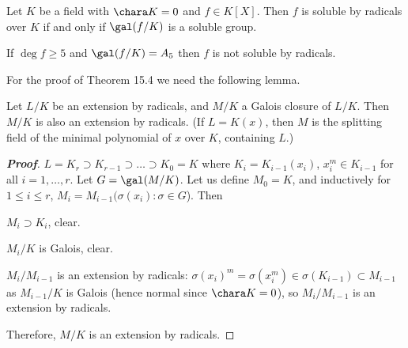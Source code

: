 \begin{theorem}
Let $K$ be a field with $\chara K = 0$ and $f \in K[X]$. Then $f$ is soluble by radicals over $K$ if and only if $\gal(f/K)$ is a soluble group.
\end{theorem}

\begin{corollary}
If $\deg f \geq 5$ and $\gal(f/K) = A_5$ then $f$ is not soluble by radicals. 
\end{corollary}

For the proof of Theorem 15.4 we need the following lemma.

\begin{lemma}
Let $L/K$ be an extension by radicals, and $M/K$ a Galois closure of $L/K$. Then $M/K$ is also an extension by radicals. (If $L = K(x)$, then $M$ is the splitting field of the minimal polynomial of $x$ over $K$, containing $L$.)
\end{lemma}

\begin{proof}[\bf Proof]
$L = K_r \supset K_{r-1} \supset \dots\supset K_0 = K$ where $K_i = K_{i-1}(x_i)$, $x^m_i \in K_{i-1}$ for all $i = 1, \dots , r$. Let $G = \gal(M/K)$. Let us define $M_0 = K$, and inductively for $1 \leq  i \leq  r$, $M_i = M_{i-1}({\sigma(x_i) : \sigma \in G}$). Then
\bit
\item $M_i \supset K_i$, clear.
\item $M_i/K$ is Galois, clear.
\item $M_i/M_{i-1}$ is an extension by radicals: $\sigma(x_i)^m = \sigma(x^m_i) \in \sigma(K_{i-1}) \subset M_{i-1}$ as $M_{i-1}/K$ is Galois (hence normal since $\chara K = 0$), so $M_i/M_{i-1}$ is an extension by radicals.
\eit

Therefore, $M/K$ is an extension by radicals.
\end{proof}


